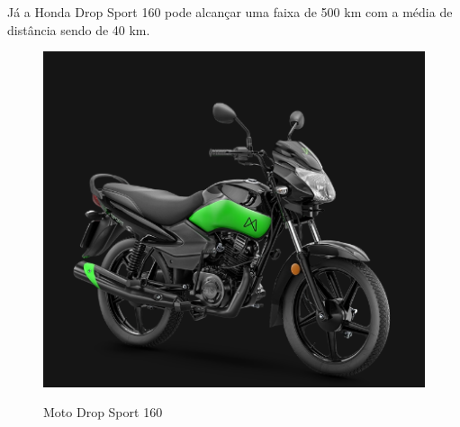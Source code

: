    Já a Honda Drop Sport 160 pode alcançar uma faixa de 500 km com a média de distância sendo de 40 km. 

   \begin{figure} [!ht]
       {\centering
       \caption{Moto Drop Sport 160}
       \includegraphics[height=0.2\linewidth]{figuras/Drop Sport160.png}
       \label{fig:enter-label}
       }
   \end{figure}